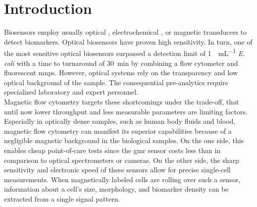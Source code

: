 \chapter{Introduction}
Biosensors employ usually optical \cite{lit:bio:BioconjugateTechniques}, electrochemical \cite{lit:fluidic:BindingPhysicsSurfaces}, or magnetic \cite{lit:thes:reisbeck, lit:bio:MRCyte2016, lit:bio:NanoCytometer} transducers to detect biomarkers.  Optical  biosensors  have  proven high sensitivity.\cite{lit:Shapiro}  In turn, one of the  most  sensitive  optical  biosensors surpassed a detection limit of \SI{1}{\cfu\per\milli\liter} \textit{E. coli} with a time to turnaround of \SI{30}{\minute} by combining a flow  cytometer and fluorescent \glspl{mnp}.\cite{lit:flowCytometer} However, optical systems rely on the transparency and low optical background of the sample. The consequential pre-analytics require specialized laboratory and expert personnel.\\
Magnetic flow cytometry targets these shortcomings under the trade-off, that until now lower throughput and less measurable parameters are limiting factors.\cite{lit:thes:reisbeck} Especially in optically dense samples, such as human body fluids and blood, magnetic flow cytometry can manifest its superior capabilities because of a negligible magnetic background in the biological samples.\cite{lit:bio:biochip:cd64} On the one side, this enables cheap point-of-care tests since the \gls{gmr} sensor costs less than  in comparison to optical spectrometers or cameras.\cite{lit:fluidic:HighFlowGMR,lit:bio:aflatoxinMNP,lit:bio:POC_CD64} On the other side, the sharp sensitivity and electronic speed of these sensors allow for precise single-cell measurements.\cite{lit:bio:MRCyte2016,lit:fluidic:GMR_Quantification, lit:paperHelou} When magnetically labeled cells are rolling over such a sensor, information about a cell's size, morphology, and biomarker density can be extracted from a single signal pattern.\cite{lit:thes:michaelBauer} 

